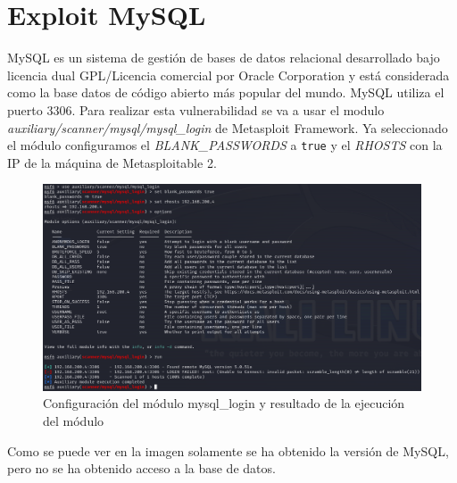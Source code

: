 \documentclass[11pt]{report}
\begin{document}
\newpage

\section{Exploit MySQL}
MySQL es un sistema de gestión de bases de datos relacional desarrollado bajo licencia dual GPL/Licencia comercial por Oracle Corporation y está considerada como la base datos de código abierto más popular del mundo. MySQL utiliza el puerto 3306. Para realizar esta vulnerabilidad
se va a usar el modulo \emph{auxiliary/scanner/mysql/mysql\_login} de Metasploit Framework. Ya seleccionado el módulo configuramos el \emph{BLANK\_PASSWORDS} a \texttt{true} y el \emph{RHOSTS} con la IP de la máquina de Metasploitable 2.
\begin{figure}[H]
  \centering
  \includegraphics[scale=0.5]{img/mysql.png}
  \caption{Configuración del módulo mysql\_login y resultado de la ejecución del módulo}
\end{figure}

Como se puede ver en la imagen solamente se ha obtenido la versión de MySQL, pero no se ha obtenido acceso a la base de datos.

\newpage
\end{document}
